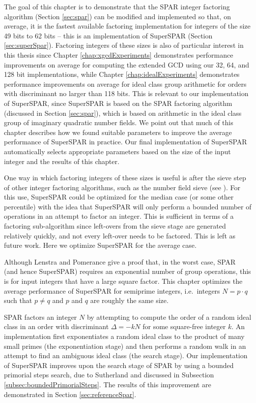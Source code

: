 \documentclass{ucalgthes1}
\theoremstyle{definition}
\begin{document}
The goal of this chapter is to demonstrate that the SPAR integer factoring algorithm (Section \ref{sec:spar}) can be modified and implemented so that, on average, it is the fastest available factoring implementation for integers of the size 49 bits to 62 bits -- this is an implementation of SuperSPAR (Section \ref{sec:superSpar}).  Factoring integers of these sizes is also of particular interest in this thesis since Chapter \ref{chap:xgcdExperiments} demonstrates performance improvements on average for computing the extended GCD using our 32, 64, and 128 bit implementations, while Chapter \ref{chap:idealExperiments} demonstrates performance improvements on average for ideal class group arithmetic for orders with discriminant no larger than 118 bits.  This is relevant to our implementation of SuperSPAR, since SuperSPAR is based on the SPAR factoring algorithm (discussed in Section \ref{sec:spar}), which is based on arithmetic in the ideal class group of imaginary quadratic number fields.  We point out that much of this chapter describes how we found suitable parameters to improve the average performance of SuperSPAR in practice.  Our final implementation of SuperSPAR automatically selects appropriate parameters based on the size of the input integer and the results of this chapter.

One way in which factoring integers of these sizes is useful is after the sieve step of other integer factoring algorithms, such as the number field sieve (see \cite[\S 6.2]{Crandall2001}).  For this use, SuperSPAR could be optimized for the median case (or some other percentile) with the idea that SuperSPAR will only perform a bounded number of operations in an attempt to factor an integer.  This is sufficient in terms of a factoring sub-algorithm since left-overs from the sieve stage are generated relatively quickly, and not every left-over needs to be factored.   This is left as future work.  Here we optimize SuperSPAR for the average case.

Although Lenstra and Pomerance \cite[p.511, \S 11]{Lenstra1992} give a proof that, in the worst case, SPAR (and hence SuperSPAR) requires an exponential number of group operations, this is for input integers that have a large square factor.  This chapter  optimizes the average performance of SuperSPAR for semiprime integers, i.e.\ integers $N = p \cdot q$ such that $p \neq q$ and $p$ and $q$ are roughly the same size. 

SPAR factors an integer $N$ by attempting to compute the order of a random ideal class in an order with discriminant $\Delta = -kN$ for some square-free integer $k$.  An implementation first exponentiates a random ideal class to the product of many small primes (the exponentiation stage) and then performs a random walk in an attempt to find an ambiguous ideal class (the search stage).  Our implementation of SuperSPAR improves upon the search stage of SPAR by using a bounded primorial steps search, due to Sutherland \cite{Sutherland2007} and discussed in Subsection \ref{subsec:boundedPrimorialSteps}.  The results of this improvement are demonstrated in Section \ref{sec:referenceSpar}.
\end{document}
